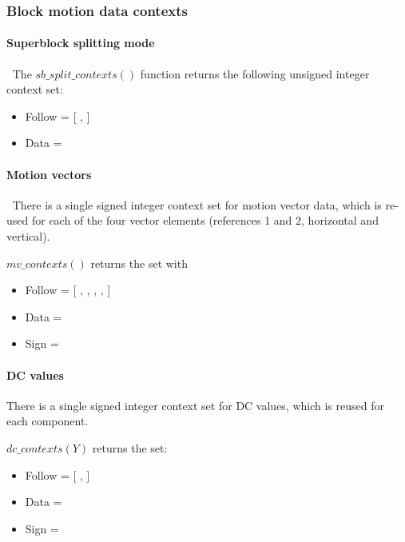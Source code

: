 \subsubsection{Block motion data contexts}

\paragraph{Superblock splitting mode}
$\ $\newline
The $sb\_split\_contexts()$ function returns the following unsigned integer context set:

\begin{itemize}
\item Follow = [ \SBSplitFollowOne, \SBSplitFollowTwo ]
\item Data = \SBSplitData
\end{itemize}

\paragraph{Motion vectors}
\label{mvcontexts}
$\ $\newline
There is a single signed integer context set for motion vector data, which is re-used for each of the four vector elements
(references 1 and 2, horizontal and vertical).

$mv\_contexts()$ returns the set with
\begin{itemize}
\item Follow = [ \VectorFollowOne, \VectorFollowTwo, \VectorFollowThree, \VectorFollowFour, \VectorFollowFivePlus ]
\item Data = \VectorData
\item Sign = \VectorSign
\end{itemize}

\paragraph{DC values}
\label{dcvaluecontexts}

There is a single signed integer context set for DC values, which is reused for each component. 

$dc\_contexts(Y)$ returns the set:

\begin{itemize}
\item Follow = [ \DCFollowOne, \DCFollowTwoPlus ]
\item Data = \DCData
\item Sign = \DCSign
\end{itemize}

